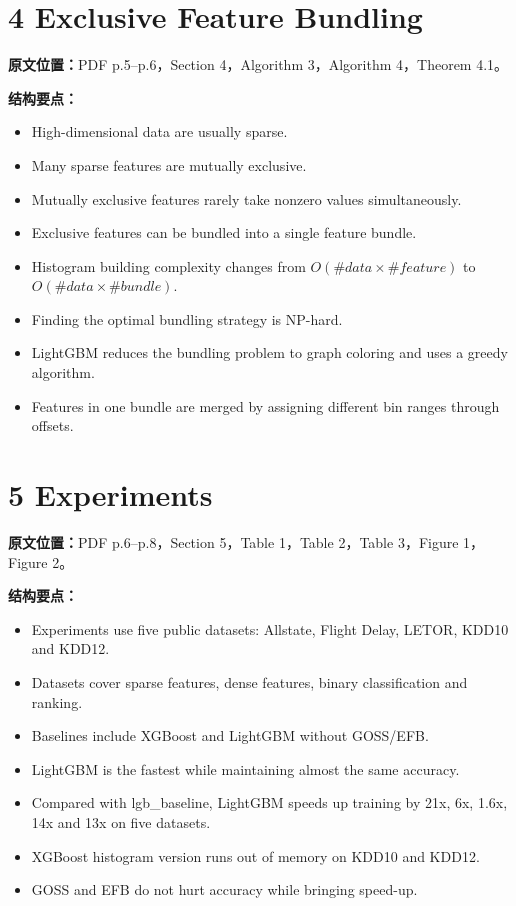 \section{4 Exclusive Feature Bundling}

\textbf{原文位置：}PDF p.5--p.6，Section 4，Algorithm 3，Algorithm 4，Theorem 4.1。

\textbf{结构要点：}
\begin{itemize}
  \item High-dimensional data are usually sparse.
  \item Many sparse features are mutually exclusive.
  \item Mutually exclusive features rarely take nonzero values simultaneously.
  \item Exclusive features can be bundled into a single feature bundle.
  \item Histogram building complexity changes from $O(\#data\times \#feature)$ to $O(\#data\times \#bundle)$.
  \item Finding the optimal bundling strategy is NP-hard.
  \item LightGBM reduces the bundling problem to graph coloring and uses a greedy algorithm.
  \item Features in one bundle are merged by assigning different bin ranges through offsets.
\end{itemize}

\section{5 Experiments}

\textbf{原文位置：}PDF p.6--p.8，Section 5，Table 1，Table 2，Table 3，Figure 1，Figure 2。

\textbf{结构要点：}
\begin{itemize}
  \item Experiments use five public datasets: Allstate, Flight Delay, LETOR, KDD10 and KDD12.
  \item Datasets cover sparse features, dense features, binary classification and ranking.
  \item Baselines include XGBoost and LightGBM without GOSS/EFB.
  \item LightGBM is the fastest while maintaining almost the same accuracy.
  \item Compared with lgb\_baseline, LightGBM speeds up training by 21x, 6x, 1.6x, 14x and 13x on five datasets.
  \item XGBoost histogram version runs out of memory on KDD10 and KDD12.
  \item GOSS and EFB do not hurt accuracy while bringing speed-up.
\end{itemize}

